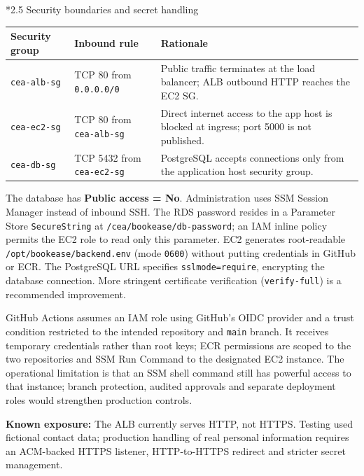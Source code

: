 \documentclass[10pt,a4paper]{article}
\makeatletter
\renewcommand{\subsection}{\@startsection{subsection}{2}{0pt}{7pt}{3pt}{\normalfont\normalsize\bfseries\color{navy}}}
\makeatother
\begin{document}
\subsection*{2.5 Security boundaries and secret handling}
\begin{tabularx}{\linewidth}{@{}p{29mm}p{36mm}X@{}}
\toprule
\textbf{Security group} & \textbf{Inbound rule} & \textbf{Rationale}\\
\midrule
\texttt{cea-alb-sg} & TCP 80 from \texttt{0.0.0.0/0} & Public traffic terminates at the load balancer; ALB outbound HTTP reaches the EC2 SG.\\
\texttt{cea-ec2-sg} & TCP 80 from \texttt{cea-alb-sg} & Direct internet access to the app host is blocked at ingress; port 5000 is not published.\\
\texttt{cea-db-sg} & TCP 5432 from \texttt{cea-ec2-sg} & PostgreSQL accepts connections only from the application host security group.\\
\bottomrule
\end{tabularx}

The database has \textbf{Public access = No}. Administration uses SSM Session Manager instead of inbound SSH. The RDS password resides in a Parameter Store \texttt{SecureString} at \texttt{/cea/bookease/db-password}; an IAM inline policy permits the EC2 role to read only this parameter. EC2 generates root-readable \texttt{/opt/bookease/backend.env} (mode \texttt{0600}) without putting credentials in GitHub or ECR. The PostgreSQL URL specifies \texttt{sslmode=require}, encrypting the database connection. More stringent certificate verification (\texttt{verify-full}) is a recommended improvement.

GitHub Actions assumes an IAM role using GitHub's OIDC provider and a trust condition restricted to the intended repository and \texttt{main} branch. It receives temporary credentials rather than root keys; ECR permissions are scoped to the two repositories and SSM Run Command to the designated EC2 instance. The operational limitation is that an SSM shell command still has powerful access to that instance; branch protection, audited approvals and separate deployment roles would strengthen production controls.

\textbf{Known exposure:} The ALB currently serves HTTP, not HTTPS. Testing used fictional contact data; production handling of real personal information requires an ACM-backed HTTPS listener, HTTP-to-HTTPS redirect and stricter secret management.
\clearpage

\end{document}
